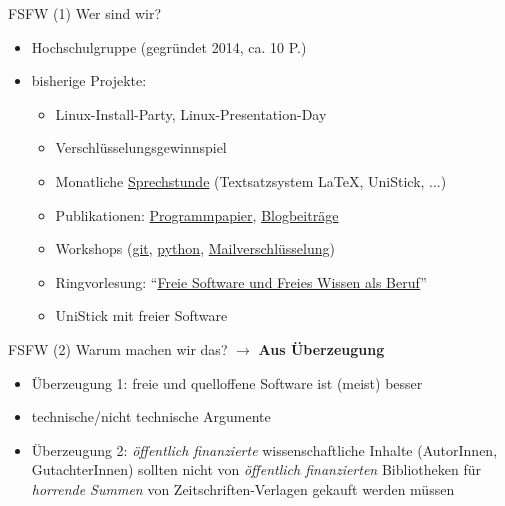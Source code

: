 \documentclass[t]{beamer}
\begin{document}
\begin{frame}[label=ct1]{\color{fg}FSFW (1)}
Wer sind wir?
  \begin{itemize}
  \item Hochschulgruppe (gegründet 2014, ca. 10 P.)
  \item bisherige Projekte:
  \begin{itemize}
   \item Linux-Install-Party, Linux-Presentation-Day
   \item Verschlüsselungsgewinnspiel
   \item Monatliche \href{https://fsfw-dresden.de/sprechstunde}{Sprechstunde} (Textsatzsystem \LaTeX, UniStick, ...)
   \item Publikationen: \href{https://fsfw-dresden.de/programm}{Programmpapier}, \href{https://fsfw-dresden.de/blog}{Blogbeiträge}
   \item Workshops (\href{https://fsfw-dresden.de/git-ws}{git}, \href{https://fsfw-dresden.de/python-workshop}{python},
   \href{https://fsfw-dresden.de/gpg}{Mailverschlüsselung})
   \item Ringvorlesung: "`\href{https://fsfw-dresden.de/ringvorlesung}{Freie Software und Freies Wissen als Beruf}"'
   \smallskip
   \item UniStick mit freier Software
  \end{itemize}
  \end{itemize}
\end{frame}


\begin{frame}[label=ct2]{\color{fg}FSFW (2)}
Warum machen wir das? $\rightarrow$ \textbf{Aus Überzeugung}\\[1cm]
  \begin{itemize}
  \item Überzeugung 1: freie und quelloffene Software ist (meist) besser
  \item[] technische/nicht technische Argumente
  \pause
  \bigskip
  \item Überzeugung 2: \textit{öffentlich finanzierte} wissenschaftliche Inhalte
  (AutorInnen, GutachterInnen) sollten nicht von \textit{öffentlich finanzierten}
  Bibliotheken für \textit{horrende Summen} von Zeitschriften-Verlagen gekauft werden müssen
  \end{itemize}
\end{frame}
\end{document}
